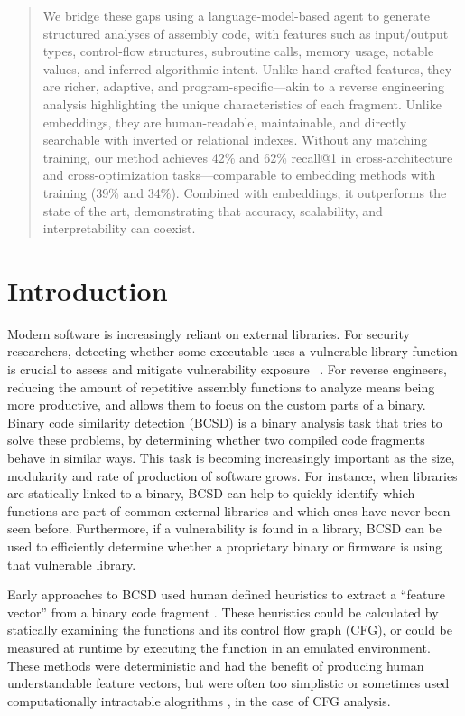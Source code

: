 \begin{abstract}
We bridge these gaps using a language-model-based agent to generate structured analyses of assembly code, with features such as input/output types, control-flow structures, subroutine calls, memory usage, notable values, and inferred algorithmic intent. Unlike hand-crafted features, they are richer, adaptive, and program-specific—akin to a reverse engineering analysis highlighting the unique characteristics of each fragment. Unlike embeddings, they are human-readable, maintainable, and directly searchable with inverted or relational indexes. Without any matching training, our method achieves 42\% and 62\% recall@1 in cross-architecture and cross-optimization tasks—comparable to embedding methods with training (39\% and 34\%). Combined with embeddings, it outperforms the state of the art, demonstrating that accuracy, scalability, and interpretability can coexist.

\end{abstract}


\section{Introduction}

Modern software is increasingly reliant on external libraries.
For security researchers, detecting whether some executable uses a vulnerable library function is crucial to assess
and mitigate vulnerability exposure ~\cite{BCSD, BCSDsurvey}. For reverse engineers, reducing the amount of repetitive assembly functions
to analyze means being more productive, and allows them to focus on the custom parts of a binary.  Binary code similarity
detection (BCSD) is a binary analysis task that tries to solve these problems, by determining whether two compiled
code fragments behave in similar ways. This task is becoming increasingly important as the size, modularity and rate of
production of software grows. For instance, when libraries are statically linked to a binary, BCSD can help to
quickly identify which functions are part of common external libraries and which ones have never been seen before.
Furthermore, if a vulnerability is found in a library, BCSD can be used to efficiently determine whether a proprietary
binary or firmware is using that vulnerable library.

Early approaches to BCSD used human defined heuristics to extract a ``feature vector'' from a binary code fragment \cite{op-seq, BinDiff, clones.net}.
These heuristics could be calculated by statically examining the functions and its control flow graph (CFG), or could be measured at runtime
by executing the function in an emulated environment. These methods were deterministic and had the benefit of producing
human understandable feature vectors, but were often too simplistic \cite{op-seq} or sometimes used computationally intractable alogrithms \cite{BinDiff}, in
the case of CFG analysis.

